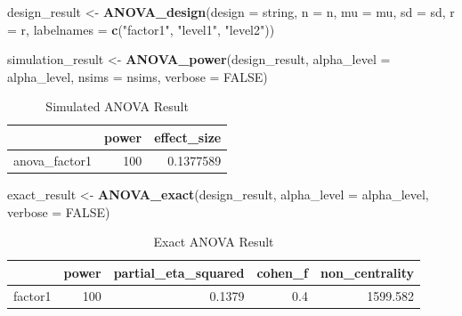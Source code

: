 \documentclass[]{book}
\newenvironment{Shaded}{\begin{snugshade}}{\end{snugshade}}
\newcommand{\DataTypeTok}[1]{\textcolor[rgb]{0.13,0.29,0.53}{#1}}
\newcommand{\KeywordTok}[1]{\textcolor[rgb]{0.13,0.29,0.53}{\textbf{#1}}}
\newcommand{\NormalTok}[1]{#1}
\newcommand{\OtherTok}[1]{\textcolor[rgb]{0.56,0.35,0.01}{#1}}
\newcommand{\StringTok}[1]{\textcolor[rgb]{0.31,0.60,0.02}{#1}}
\begin{document}
\begin{Shaded}
\begin{Highlighting}[]
\NormalTok{design_result <-}\StringTok{ }\KeywordTok{ANOVA_design}\NormalTok{(}\DataTypeTok{design =}\NormalTok{ string,}
                   \DataTypeTok{n =}\NormalTok{ n, }
                   \DataTypeTok{mu =}\NormalTok{ mu, }
                   \DataTypeTok{sd =}\NormalTok{ sd, }
                   \DataTypeTok{r =}\NormalTok{ r, }
                   \DataTypeTok{labelnames =} \KeywordTok{c}\NormalTok{(}\StringTok{"factor1"}\NormalTok{, }\StringTok{"level1"}\NormalTok{, }\StringTok{"level2"}\NormalTok{))}

\NormalTok{simulation_result <-}\StringTok{ }\KeywordTok{ANOVA_power}\NormalTok{(design_result, }
                                 \DataTypeTok{alpha_level =}\NormalTok{ alpha_level, }
                                 \DataTypeTok{nsims =}\NormalTok{ nsims,}
                                 \DataTypeTok{verbose =} \OtherTok{FALSE}\NormalTok{)}
\end{Highlighting}
\end{Shaded}

\begin{table}[t]

\caption{\label{tab:unnamed-chunk-69}Simulated ANOVA Result}
\centering
\begin{tabular}{l|r|r}
\hline
  & power & effect\_size\\
\hline
anova\_factor1 & 100 & 0.1377589\\
\hline
\end{tabular}
\end{table}

\begin{Shaded}
\begin{Highlighting}[]
\NormalTok{exact_result <-}\StringTok{ }\KeywordTok{ANOVA_exact}\NormalTok{(design_result,}
                            \DataTypeTok{alpha_level =}\NormalTok{ alpha_level,}
                            \DataTypeTok{verbose =} \OtherTok{FALSE}\NormalTok{)}
\end{Highlighting}
\end{Shaded}

\begin{table}[t]

\caption{\label{tab:unnamed-chunk-71}Exact ANOVA Result}
\centering
\begin{tabular}{l|r|r|r|r}
\hline
  & power & partial\_eta\_squared & cohen\_f & non\_centrality\\
\hline
factor1 & 100 & 0.1379 & 0.4 & 1599.582\\
\hline
\end{tabular}
\end{table}
\end{document}
